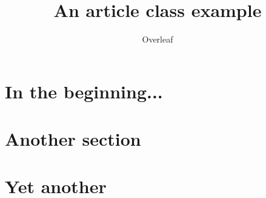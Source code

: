 \documentclass{article}
\title{An article class example}
\author{Overleaf}
\begin{document}
	\maketitle
	
	\section{In the beginning...}
	\lipsum[2]
	
	\section{Another section}
	\lipsum[1]
	
	\section{Yet another}
	\lipsum[1]
	
\end{document}
